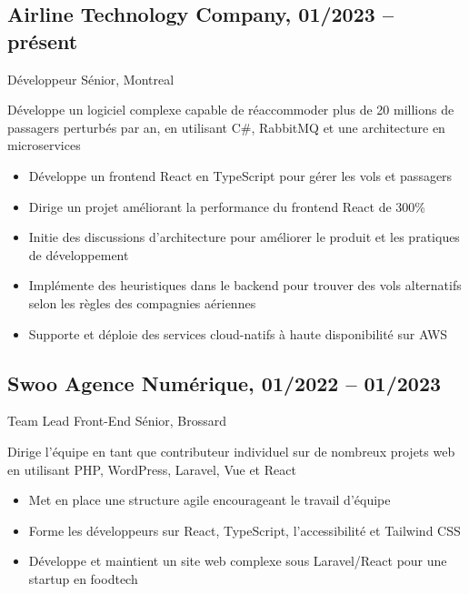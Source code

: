 \documentclass{article}
\begin{document}
\begin{paracol}{2}
\begin{rightcolumn}
    \subsection{Airline Technology Company, 01/2023 -- présent}
    {Développeur Sénior, Montreal\par}
    {
      Développe un logiciel complexe capable de réaccommoder plus de 20 millions de passagers perturbés par an, en utilisant C\#, RabbitMQ et une architecture en microservices
    \par}
    \begin{itemize}
      \item Développe un frontend React en TypeScript pour gérer les vols et passagers
      \item Dirige un projet améliorant la performance du frontend React de 300\%
      \item Initie des discussions d’architecture pour améliorer le produit et les pratiques de développement
      \item Implémente des heuristiques dans le backend pour trouver des vols alternatifs selon les règles des compagnies aériennes
      \item Supporte et déploie des services cloud-natifs à haute disponibilité sur AWS
    \end{itemize}

    \vspace{1em}

    \subsection{Swoo Agence Numérique, 01/2022 -- 01/2023}
    {Team Lead Front-End Sénior, Brossard\par}
    {
      Dirige l’équipe en tant que contributeur individuel sur de nombreux projets web en utilisant PHP, WordPress, Laravel, Vue et React
    \par}
    \begin{itemize}
      \item Met en place une structure agile encourageant le travail d’équipe
      \item Forme les développeurs sur React, TypeScript, l’accessibilité et Tailwind CSS
      \item Développe et maintient un site web complexe sous Laravel/React pour une startup en foodtech
    \end{itemize}


\end{rightcolumn}
\end{paracol}
\end{document}
